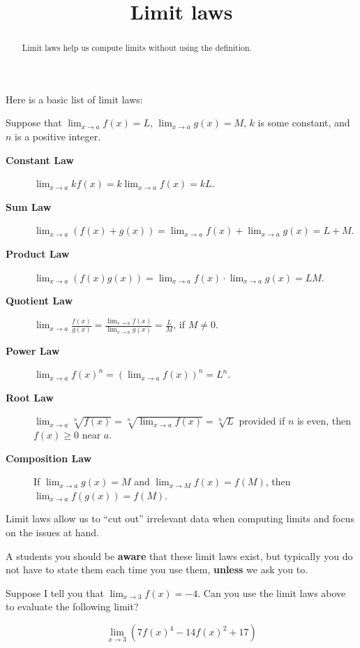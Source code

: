 \documentclass{ximera}
\title{Limit laws}
\begin{document}
\begin{abstract}
  Limit laws help us compute limits without using the definition.
\end{abstract}

\maketitle

Here is a basic list of limit laws:

\begin{theorem}
Suppose that $\lim_{x\to a}f(x)=L$, $\lim_{x\to a}g(x)=M$, $k$
is some constant, and $n$ is a positive integer.
\begin{description}
\item[\textbf{Constant Law}] $\lim_{x\to a} kf(x) = k\lim_{x\to a}f(x)=kL$.
\item[\textbf{Sum Law}] $\lim_{x\to a} (f(x)+g(x)) = \lim_{x\to a}f(x)+\lim_{x\to a}g(x)=L+M$.  
\item[\textbf{Product Law}] $\lim_{x\to a} (f(x)g(x)) = \lim_{x\to a}f(x)\cdot\lim_{x\to a}g(x)=LM$. 
\item[\textbf{Quotient Law}] $\lim_{x\to a} \frac{f(x)}{g(x)} =
  \frac{\lim_{x\to a}f(x)}{\lim_{x\to a}g(x)}=\frac{L}{M}$, if $M\ne0$.
\item[\textbf{Power Law}] $\lim_{x\to a} f(x)^n = \left(\lim_{x\to a}f(x)\right)^n=L^n$.
\item[\textbf{Root Law}] $\lim_{x\to a} \sqrt[n]{f(x)} = \sqrt[n]{\lim_{x\to
    a}f(x)}=\sqrt[n]{L}$ provided if $n$ is even, then $f(x)\ge 0$
  near $a$.
\item[\textbf{Composition Law}] If $\lim_{x\to a}g(x)=M$ and
  $\lim_{x\to M}f(x) = f(M)$, then $\lim_{x\to a} f(g(x)) = f(M)$.
\end{description}
\end{theorem}


Limit laws allow us to ``cut out'' irrelevant data when computing
limits and focus on the issues at hand.

A students you should be \textbf{aware} that these limit laws exist,
but typically you do not have to state them each time you use them,
\textbf{unless} we ask you to.

\begin{question}
  Suppose I tell you that $\lim_{x\to 3} f(x) = -4$. Can you use the
  limit laws above to evaluate the following limit?

\[
\lim_{x\to 3} \left(7f(x)^4 - 14f(x)^2 + 17\right)
\]

    \begin{multipleChoice}
    \end{multipleChoice}  
\end{question}
\end{document}
